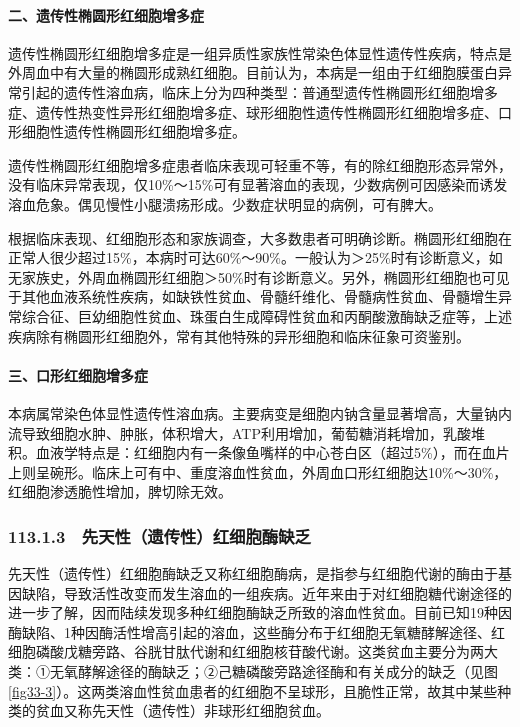 \paragraph{二、遗传性椭圆形红细胞增多症}

遗传性椭圆形红细胞增多症是一组异质性家族性常染色体显性遗传性疾病，特点是外周血中有大量的椭圆形成熟红细胞。目前认为，本病是一组由于红细胞膜蛋白异常引起的遗传性溶血病，临床上分为四种类型：普通型遗传性椭圆形红细胞增多症、遗传性热变性异形红细胞增多症、球形细胞性遗传性椭圆形红细胞增多症、口形细胞性遗传性椭圆形红细胞增多症。

遗传性椭圆形红细胞增多症患者临床表现可轻重不等，有的除红细胞形态异常外，没有临床异常表现，仅10\%～15\%可有显著溶血的表现，少数病例可因感染而诱发溶血危象。偶见慢性小腿溃疡形成。少数症状明显的病例，可有脾大。

根据临床表现、红细胞形态和家族调查，大多数患者可明确诊断。椭圆形红细胞在正常人很少超过15\%，本病时可达60\%～90\%。一般认为＞25\%时有诊断意义，如无家族史，外周血椭圆形红细胞＞50\%时有诊断意义。另外，椭圆形红细胞也可见于其他血液系统性疾病，如缺铁性贫血、骨髓纤维化、骨髓病性贫血、骨髓增生异常综合征、巨幼细胞性贫血、珠蛋白生成障碍性贫血和丙酮酸激酶缺乏症等，上述疾病除有椭圆形红细胞外，常有其他特殊的异形细胞和临床征象可资鉴别。

\paragraph{三、口形红细胞增多症}

本病属常染色体显性遗传性溶血病。主要病变是细胞内钠含量显著增高，大量钠内流导致细胞水肿、肿胀，体积增大，ATP利用增加，葡萄糖消耗增加，乳酸堆积。血液学特点是：红细胞内有一条像鱼嘴样的中心苍白区（超过5\%），而在血片上则呈碗形。临床上可有中、重度溶血性贫血，外周血口形红细胞达10\%～30\%，红细胞渗透脆性增加，脾切除无效。

\subsubsection{113.1.3　先天性（遗传性）红细胞酶缺乏}

先天性（遗传性）红细胞酶缺乏又称红细胞酶病，是指参与红细胞代谢的酶由于基因缺陷，导致活性改变而发生溶血的一组疾病。近年来由于对红细胞糖代谢途径的进一步了解，因而陆续发现多种红细胞酶缺乏所致的溶血性贫血。目前已知19种因酶缺陷、1种因酶活性增高引起的溶血，这些酶分布于红细胞无氧糖酵解途径、红细胞磷酸戊糖旁路、谷胱甘肽代谢和红细胞核苷酸代谢。这类贫血主要分为两大类：①无氧酵解途径的酶缺乏；②己糖磷酸旁路途径酶和有关成分的缺乏（见图\ref{fig33-3}）。这两类溶血性贫血患者的红细胞不呈球形，且脆性正常，故其中某些种类的贫血又称先天性（遗传性）非球形红细胞贫血。

